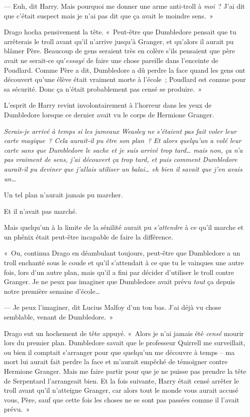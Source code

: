 --- Euh, dit Harry. Mais pourquoi me donner une arme anti-troll à \emph{moi}~? J'ai dit que c'était suspect mais je n'ai pas dit que ça avait le moindre sens.~»

Drago hocha pensivement la tête. «~Peut-être que Dumbledore pensait que tu arrêterais le troll avant qu'il n'arrive jusqu'à Granger, et qu'alors il aurait pu blâmer Père. Beaucoup de gens seraient très en colère s'ils pensaient que père avait ne serait-ce qu'\emph{essayé} de faire une chose pareille dans l'enceinte de Poudlard. Comme Père a dit, Dumbledore a dû perdre la face quand les gens ont découvert qu'une élève était vraiment morte à l'école~; Poudlard est connue pour sa sécurité. Donc ça n'était probablement pas censé se produire.~»

L'esprit de Harry revint involontairement à l'horreur dans les yeux de Dumbledore lorsque ce dernier avait vu le corps de Hermione Granger.

\emph{Serais-je arrivé à temps si les jumeaux Weasley ne s'étaient pas fait voler leur carte magique~? Cela aurait-il pu être son plan~? Et alors quelqu'un a volé leur carte sans que Dumbledore le sache et je suis arrivé trop tard… mais non, ça n'a pas vraiment de sens, j'ai découvert ça trop tard, et puis comment Dumbledore aurait-il pu deviner que j'allais utiliser un balai… eh bien il savait que j'en avais un…}

Un tel plan n'aurait jamais pu marcher.

Et il n'avait pas marché.

Mais quelqu'un à la limite de la sénilité aurait pu \emph{s'attendre} à ce qu'il marche et un phénix était peut-être incapable de faire la différence.

«~Ou, continua Drago en déambulant toujours, peut-être que Dumbledore a un troll enchanté sous le coude et qu'il s'attendait à ce que tu le vainques une autre fois, lors d'un autre plan, mais qu'il a fini par décider d'utiliser le troll contre Granger. Je ne peux pas imaginer que Dumbledore avait prévu \emph{tout} ça depuis notre première semaine d'école…

--- Je peux l'imaginer, dit Lucius Malfoy d'un ton bas. J'ai déjà vu chose semblable, venant de Dumbledore.~»

Drago eut un hochement de tête appuyé. «~Alors je n'ai jamais été \emph{censé} mourir lors du premier plan. Dumbledore savait que le professeur Quirrell me surveillait, ou bien il comptait s'arranger pour que quelqu'un me découvre à temps -- ma mort lui aurait fait perdre la face et m'aurait empêché de témoigner contre Hermione Granger. Mais me faire partir pour que je ne puisse pas prendre la tête de Serpentard l'arrangeait bien. Et la fois suivante, Harry était censé arrêter le troll avant qu'il n'atteigne Granger, car alors tout le monde vous aurait accusé vous, Père, sauf que cette fois les choses ne se sont pas passées comme il l'avait prévu.~»

